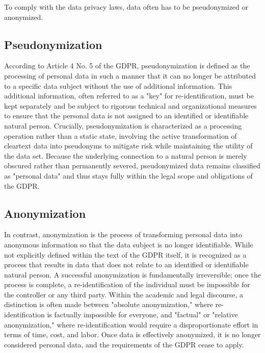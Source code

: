 To comply with the data privacy laws, data often has to be pseudonymized or anonymized.

\subsection{Pseudonymization}

According to Article 4 No. 5 of the \ac{GDPR}, pseudonymization is defined as the processing of personal data in such a manner that it can no longer be attributed to a specific data subject without the use of additional information. This additional information, often referred to as a "key" for re-identification, must be kept separately and be subject to rigorous technical and organizational measures to ensure that the personal data is not assigned to an identified or identifiable natural person. Crucially, pseudonymization is characterized as a processing operation rather than a static state, involving the active transformation of cleartext data into pseudonyms to mitigate risk while maintaining the utility of the data set. Because the underlying connection to a natural person is merely obscured rather than permanently severed, pseudonymized data remains classified as "personal data" and thus stays fully within the legal scope and obligations of the \ac{GDPR}.
 \autocite[8, 21, 71]{gmdsbvd2024praxishilfe}
 \autocite[14]{schwartmann2022praxisleitfaden}

\subsection{Anonymization}

In contrast, anonymization is the process of transforming personal data into anonymous information so that the data subject is no longer identifiable. While not explicitly defined within the text of the \ac{GDPR} itself, it is recognized as a process that results in data that does not relate to an identified or identifiable natural person. A successful anonymization is fundamentally irreversible; once the process is complete, a re-identification of the individual must be impossible for the controller or any third party. Within the academic and legal discourse, a distinction is often made between "absolute anonymization," where re-identification is factually impossible for everyone, and "factual" or "relative anonymization," where re-identification would require a disproportionate effort in terms of time, cost, and labor. Once data is effectively anonymized, it is no longer considered personal data, and the requirements of the \ac{GDPR} cease to apply.
\autocite[1, 9--10, 13, 21, 68, 73]{gmdsbvd2024praxishilfe}
\autocite[3, 16--19, 23]{schwartmann2022praxisleitfaden}

